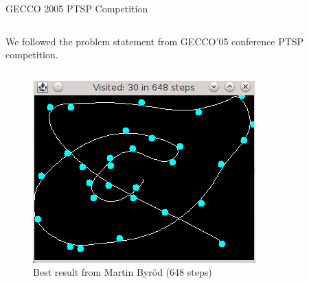 \documentclass[final,t]{beamer}
\begin{document}
\begin{frame}{}
\begin{columns}[t]
\begin{column}{.305\linewidth}
      \begin{block}{GECCO 2005 PTSP Competition}
      \centering
        \begin{column}{.97\linewidth}
        \justifying
        We followed the \alert{problem statement} from GECCO'05 conference PTSP competition. 
        \begin{columns}[T]
          \begin{column}{.53\linewidth} 
            \begin{figure}
              \centering
              \includegraphics[width=\linewidth]{byrod_solution1.png}          
              \caption{\centering Best result from Martin Byr\"{o}d (648 steps)}
            \end{figure}
          \end{column}


\end{columns}
\end{column}
\end{block}
\end{column}
\end{columns}
\end{frame}
\end{document}
